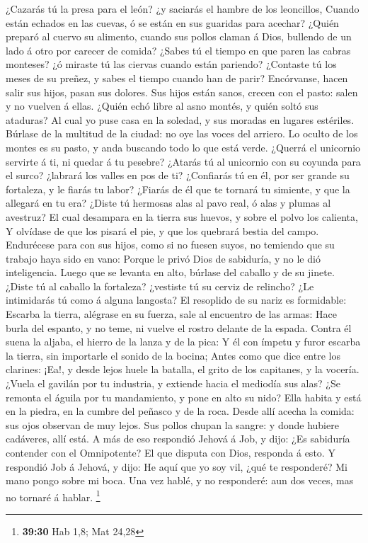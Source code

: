  ¿Cazarás tú la presa para el león? ¿y saciarás el hambre
de los leoncillos,  Cuando están echados en las cuevas, ó
se están en sus guaridas para acechar?  ¿Quién preparó al
cuervo su alimento, cuando sus pollos claman á Dios, bullendo de un lado
á otro por carecer de comida?  ¿Sabes tú el tiempo en que
paren las cabras monteses? ¿ó miraste tú las ciervas cuando están
pariendo?  ¿Contaste tú los meses de su preñez, y sabes el
tiempo cuando han de parir?  Encórvanse, hacen salir sus
hijos, pasan sus dolores.  Sus hijos están sanos, crecen
con el pasto: salen y no vuelven á ellas.  ¿Quién echó
libre al asno montés, y quién soltó sus ataduras?  Al cual
yo puse casa en la soledad, y sus moradas en lugares estériles.
 Búrlase de la multitud de la ciudad: no oye las voces
del arriero.  Lo oculto de los montes es su pasto, y anda
buscando todo lo que está verde.  ¿Querrá el unicornio
servirte á ti, ni quedar á tu pesebre?  ¿Atarás tú al
unicornio con su coyunda para el surco? ¿labrará los valles en pos de
ti?  ¿Confiarás tú en él, por ser grande su fortaleza, y
le fiarás tu labor?  ¿Fiarás de él que te tornará tu
simiente, y que la allegará en tu era?  ¿Diste tú
hermosas alas al pavo real, ó alas y plumas al avestruz? 
El cual desampara en la tierra sus huevos, y sobre el polvo los
calienta,  Y olvídase de que los pisará el pie, y que los
quebrará bestia del campo.  Endurécese para con sus
hijos, como si no fuesen suyos, no temiendo que su trabajo haya sido en
vano:  Porque le privó Dios de sabiduría, y no le dió
inteligencia.  Luego que se levanta en alto, búrlase del
caballo y de su jinete.  ¿Diste tú al caballo la
fortaleza? ¿vestiste tú su cerviz de relincho?  ¿Le
intimidarás tú como á alguna langosta? El resoplido de su nariz es
formidable:  Escarba la tierra, alégrase en su fuerza,
sale al encuentro de las armas:  Hace burla del espanto,
y no teme, ni vuelve el rostro delante de la espada. 
Contra él suena la aljaba, el hierro de la lanza y de la pica:
 Y él con ímpetu y furor escarba la tierra, sin
importarle el sonido de la bocina;  Antes como que dice
entre los clarines: ¡Ea!, y desde lejos huele la batalla, el grito de
los capitanes, y la vocería.  ¿Vuela el gavilán por tu
industria, y extiende hacia el mediodía sus alas?  ¿Se
remonta el águila por tu mandamiento, y pone en alto su nido? Ella
habita y está en la piedra, en la cumbre del peñasco y de la roca. Desde
allí acecha la comida: sus ojos observan de muy lejos. Sus pollos chupan
la sangre: y donde hubiere cadáveres, allí está. A más de eso respondió
Jehová á Job, y dijo: ¿Es sabiduría contender con el Omnipotente? El que
disputa con Dios, responda á esto. Y respondió Job á Jehová, y dijo: He
aquí que yo soy vil, ¿qué te responderé? Mi mano pongo sobre mi boca.
Una vez hablé, y no responderé: aun dos veces, mas no tornaré á hablar.
\footnote{\textbf{39:30} Hab 1,8; Mat 24,28}

